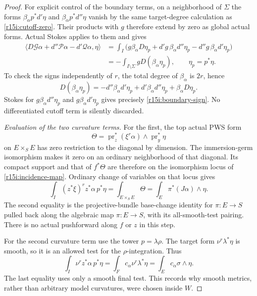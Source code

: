 \begin{proof}
For explicit control of the boundary terms, on a neighborhood
of $\Sigma$ the forms
$\beta_\alpha p^*d'\eta$ and
$\beta_\alpha p^*d''\eta$ vanish by the same target-degree
calculation as \eqref{r15i:cutoff-zero}.
Their products with $g$ therefore extend by zero as global
actual forms.  Actual Stokes applies to them and gives
\[
 \begin{split}
 \big\langle D\mathcal G\alpha+d''\mathcal P\alpha
                         -d'\mathcal Q\alpha,\eta\big\rangle
 &=\int_I\bigl(g\beta_\alpha D\eta_p
       +d'g\,\beta_\alpha d''\eta_p
       -d''g\,\beta_\alpha d'\eta_p\bigr)\\
 &=-\int_{I\setminus\Sigma}gD(\beta_\alpha\eta_p),
 \qquad \eta_p=p^*\eta.
 \end{split}
\tag{I15.15}\label{r15i:boundary-sign}
\]
To check the signs independently of $r$, the total degree of
$\beta_\alpha$ is $2r$, hence
\[
 D(\beta_\alpha\eta_p)
   =-d''\beta_\alpha d'\eta_p
        +d'\beta_\alpha d''\eta_p+\beta_\alpha D\eta_p.
\]
Stokes for $g\beta_\alpha d''\eta_p$ and
$g\beta_\alpha d'\eta_p$ gives precisely
\eqref{r15i:boundary-sign}.  No differentiated cutoff term
is silently discarded.

\emph{Evaluation of the two curvature terms.}
For the first, the top actual PWS form
\[
       \Theta=\operatorname{pr}_z^*(\xi^r\alpha)
                              \wedge\operatorname{pr}_y^*\eta
\]
on $E\times_S E$ has zero restriction to the diagonal by
dimension.  The immersion-germ isomorphism makes it zero on
an ordinary neighborhood of that diagonal.  Its compact
support and that of $f^*\Theta$ are therefore on the
isomorphism locus of \eqref{r15i:incidence-map}.  Ordinary
change of variables on that locus gives
\[
 \int_I(z^*\xi)^r z^*\alpha\,p^*\eta
       =\int_{E\times_S E}\Theta
       =\int_E\pi^*(J\alpha)\wedge\eta.
\tag{I15.16}\label{r15i:first-term}
\]
The second equality is the projective-bundle base-change
identity for $\pi:E\to S$ pulled back along the algebraic
map $\pi:E\to S$, with its all-smooth-test pairing.
There is no actual pushforward along $f$ or $z$ in this step.

For the second curvature term use the tower $p=\lambda\rho$.
The target form $\nu^r\lambda^*\eta$ is smooth, so it is
an allowed test for the $\rho$-integration.  Thus
\[
 \int_I\nu^r z^*\alpha\,p^*\eta
       =\int_F c_\alpha\nu^r\lambda^*\eta
       =\int_E c_\alpha\sigma\wedge\eta.
\tag{I15.17}\label{r15i:second-term}
\]
The last equality uses only a smooth final test.  This records
why smooth metrics, rather than arbitrary model curvatures,
were chosen inside $W$.


\end{proof}
